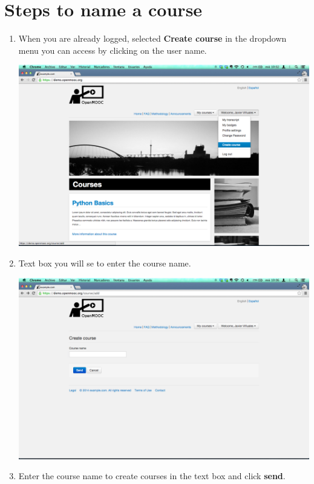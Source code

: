 \documentclass[letterpaper,10pt,english]{sphinxmanual}
\begin{document}
\section{Steps to name a course}
\label{naming_the_course:steps-to-name-a-course}\begin{enumerate}
\item {} 
When you are already logged, selected \textbf{Create course} in the dropdown menu you can access by clicking on the user name.

\includegraphics{1_create_course-1.png}

\item {} 
Text box you will se to enter the course name.

\includegraphics{1_create_course-2.png}

\item {} 
Enter the course name to create courses in the text box and click \textbf{send}.


\end{enumerate}
\end{document}
